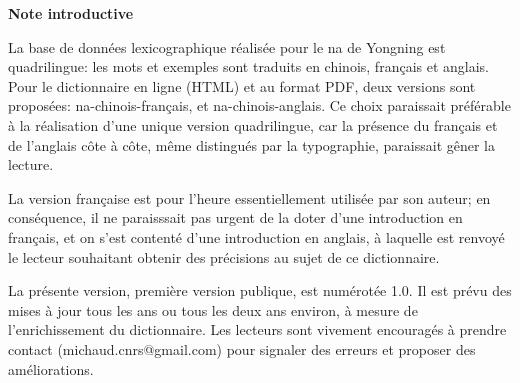 	{\LARGE \textbf{Note introductive}}
	
La base de données lexicographique réalisée pour le na de Yongning est quadrilingue: les mots et exemples sont traduits en chinois, français et anglais. Pour le dictionnaire en ligne (HTML) et au format PDF, deux versions sont proposées: na-chinois-français, et na-chinois-anglais. Ce choix paraissait préférable à la réalisation d'une unique version quadrilingue, car la présence du français et de l'anglais côte à côte, même distingués par la typographie, paraissait gêner la lecture.

La version française est pour l'heure essentiellement utilisée par son auteur; en conséquence, il ne paraisssait pas urgent de la doter d'une introduction en français, et on s'est contenté d'une introduction en anglais, à laquelle est renvoyé le lecteur souhaitant obtenir des précisions au sujet de ce dictionnaire. 

La présente version, première version publique, est numérotée 1.0. Il est prévu des mises à jour tous les ans ou tous les deux ans environ, à mesure de l'enrichissement du dictionnaire. Les lecteurs sont vivement encouragés à prendre contact (michaud.cnrs@gmail.com) pour signaler des erreurs et proposer des améliorations.

